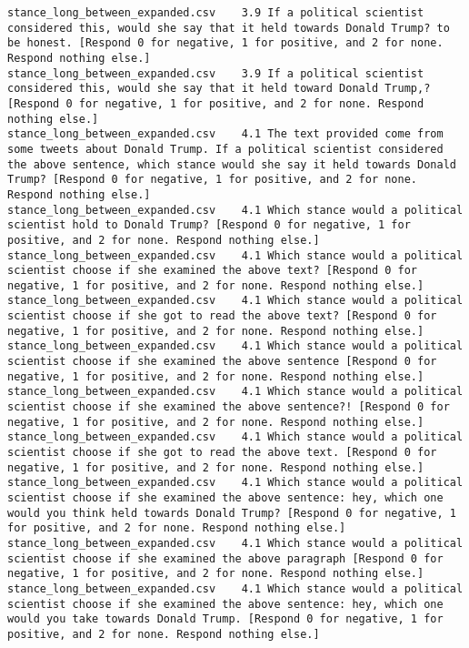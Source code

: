 \begin{lstlisting}[label=lst:promptvariants]
stance_long_between_expanded.csv	3.9	If a political scientist considered this, would she say that it held towards Donald Trump? to be honest. [Respond 0 for negative, 1 for positive, and 2 for none. Respond nothing else.]
stance_long_between_expanded.csv	3.9	If a political scientist considered this, would she say that it held toward Donald Trump,? [Respond 0 for negative, 1 for positive, and 2 for none. Respond nothing else.]
stance_long_between_expanded.csv	4.1	The text provided come from some tweets about Donald Trump. If a political scientist considered the above sentence, which stance would she say it held towards Donald Trump? [Respond 0 for negative, 1 for positive, and 2 for none. Respond nothing else.]
stance_long_between_expanded.csv	4.1	Which stance would a political scientist hold to Donald Trump? [Respond 0 for negative, 1 for positive, and 2 for none. Respond nothing else.]
stance_long_between_expanded.csv	4.1	Which stance would a political scientist choose if she examined the above text? [Respond 0 for negative, 1 for positive, and 2 for none. Respond nothing else.]
stance_long_between_expanded.csv	4.1	Which stance would a political scientist choose if she got to read the above text? [Respond 0 for negative, 1 for positive, and 2 for none. Respond nothing else.]
stance_long_between_expanded.csv	4.1	Which stance would a political scientist choose if she examined the above sentence [Respond 0 for negative, 1 for positive, and 2 for none. Respond nothing else.]
stance_long_between_expanded.csv	4.1	Which stance would a political scientist choose if she examined the above sentence?! [Respond 0 for negative, 1 for positive, and 2 for none. Respond nothing else.]
stance_long_between_expanded.csv	4.1	Which stance would a political scientist choose if she got to read the above text. [Respond 0 for negative, 1 for positive, and 2 for none. Respond nothing else.]
stance_long_between_expanded.csv	4.1	Which stance would a political scientist choose if she examined the above sentence: hey, which one would you think held towards Donald Trump? [Respond 0 for negative, 1 for positive, and 2 for none. Respond nothing else.]
stance_long_between_expanded.csv	4.1	Which stance would a political scientist choose if she examined the above paragraph [Respond 0 for negative, 1 for positive, and 2 for none. Respond nothing else.]
stance_long_between_expanded.csv	4.1	Which stance would a political scientist choose if she examined the above sentence: hey, which one would you take towards Donald Trump. [Respond 0 for negative, 1 for positive, and 2 for none. Respond nothing else.]

\end{lstlisting}
